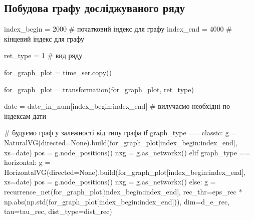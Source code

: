 \documentclass[
  letterpaper,
]{report}
\newenvironment{Shaded}{\begin{snugshade}}{\end{snugshade}}
\newcommand{\BuiltInTok}[1]{\textcolor[rgb]{0.00,0.23,0.31}{#1}}
\newcommand{\CommentTok}[1]{\textcolor[rgb]{0.37,0.37,0.37}{#1}}
\newcommand{\ControlFlowTok}[1]{\textcolor[rgb]{0.00,0.23,0.31}{#1}}
\newcommand{\DecValTok}[1]{\textcolor[rgb]{0.68,0.00,0.00}{#1}}
\newcommand{\NormalTok}[1]{\textcolor[rgb]{0.00,0.23,0.31}{#1}}
\newcommand{\OperatorTok}[1]{\textcolor[rgb]{0.37,0.37,0.37}{#1}}
\newcommand{\StringTok}[1]{\textcolor[rgb]{0.13,0.47,0.30}{#1}}
\newcommand{\VariableTok}[1]{\textcolor[rgb]{0.07,0.07,0.07}{#1}}
\begin{document}
\hypertarget{ux43fux43eux431ux443ux434ux43eux432ux430-ux433ux440ux430ux444ux443-ux434ux43eux441ux43bux456ux434ux436ux443ux432ux430ux43dux43eux433ux43e-ux440ux44fux434ux443}{%
\subsection{Побудова графу досліджуваного
ряду}\label{ux43fux43eux431ux443ux434ux43eux432ux430-ux433ux440ux430ux444ux443-ux434ux43eux441ux43bux456ux434ux436ux443ux432ux430ux43dux43eux433ux43e-ux440ux44fux434ux443}}

\begin{Shaded}
\begin{Highlighting}[]
\NormalTok{index\_begin }\OperatorTok{=} \DecValTok{2000}  \CommentTok{\# початковий індекс для графу}
\NormalTok{index\_end }\OperatorTok{=} \DecValTok{4000}    \CommentTok{\# кінцевий індекс для графу}

\NormalTok{ret\_type }\OperatorTok{=} \DecValTok{1}        \CommentTok{\# вид ряду}

\NormalTok{for\_graph\_plot }\OperatorTok{=}\NormalTok{ time\_ser.copy()}

\NormalTok{for\_graph\_plot }\OperatorTok{=}\NormalTok{ transformation(for\_graph\_plot, ret\_type)}

\NormalTok{date }\OperatorTok{=}\NormalTok{ date\_in\_num[index\_begin:index\_end] }\CommentTok{\# вилучаємо необхідні по індексам дати}

\CommentTok{\# будуємо граф у залежності від типу графа}
\ControlFlowTok{if}\NormalTok{ graph\_type }\OperatorTok{==} \StringTok{\textquotesingle{}classic\textquotesingle{}}\NormalTok{:}
\NormalTok{    g }\OperatorTok{=}\NormalTok{ NaturalVG(directed}\OperatorTok{=}\VariableTok{None}\NormalTok{).build(for\_graph\_plot[index\_begin:index\_end], xs}\OperatorTok{=}\NormalTok{date)}
\NormalTok{    pos }\OperatorTok{=}\NormalTok{ g.node\_positions()}
\NormalTok{    nxg }\OperatorTok{=}\NormalTok{ g.as\_networkx()}
\ControlFlowTok{elif}\NormalTok{ graph\_type }\OperatorTok{==} \StringTok{\textquotesingle{}horizontal\textquotesingle{}}\NormalTok{:}
\NormalTok{    g }\OperatorTok{=}\NormalTok{ HorizontalVG(directed}\OperatorTok{=}\VariableTok{None}\NormalTok{).build(for\_graph\_plot[index\_begin:index\_end], xs}\OperatorTok{=}\NormalTok{date)}
\NormalTok{    pos }\OperatorTok{=}\NormalTok{ g.node\_positions()}
\NormalTok{    nxg }\OperatorTok{=}\NormalTok{ g.as\_networkx()}
\ControlFlowTok{else}\NormalTok{:}
\NormalTok{    g }\OperatorTok{=}\NormalTok{ recurrence\_net(for\_graph\_plot[index\_begin:index\_end], }
\NormalTok{                       rec\_thr}\OperatorTok{=}\NormalTok{eps\_rec }\OperatorTok{*}\NormalTok{ np.}\BuiltInTok{abs}\NormalTok{(np.std(for\_graph\_plot[index\_begin:index\_end])), }
\NormalTok{                       dim}\OperatorTok{=}\NormalTok{d\_e\_rec, }
\NormalTok{                       tau}\OperatorTok{=}\NormalTok{tau\_rec, }
\NormalTok{                       dist\_type}\OperatorTok{=}\NormalTok{dist\_rec)}
    

\end{Highlighting}
\end{Shaded}
\end{document}
